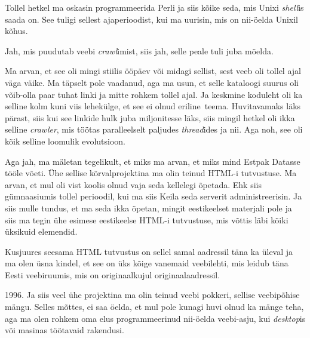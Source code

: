 
Tollel hetkel ma oskasin programmeerida Perli ja siis kõike 
seda, mis  Unixi \emph{shell}is saada on. See tuligi  sellest ajaperioodist, 
kui ma uurisin, mis on nii-öelda Unixil  kõhus.


Jah, mis puudutab veebi \emph{crawl}imist,  siis jah, selle peale tuli juba 
mõelda.


Ma arvan, et see oli mingi stiilis ööpäev või midagi sellist, sest veeb oli 
tollel ajal väga väike. Ma täpselt pole vaadanud, aga ma usun, et selle 
kataloogi suurus oli võib-olla paar tuhat linki ja mitte rohkem tollel ajal. Ja 
keskmine koduleht oli ka selline kolm kuni viis lehekülge, et see ei  olnud 
eriline teema. Huvitavamaks läks pärast, siis kui see linkide hulk juba 
miljonitesse läks, siis mingil hetkel oli ikka selline \emph{crawler}, mis 
töötas paralleelselt  paljudes \emph{thread}ides ja nii. Aga noh, see oli kõik 
selline loomulik evolutsioon. 

Aga jah, ma mäletan tegelikult, et miks ma arvan, et miks mind Estpak 
Datasse tööle võeti. Ühe sellise kõrvalprojektina ma olin 
teinud HTML-i tutvustuse. Ma arvan, et mul oli vist koolis olnud vaja seda 
kellelegi õpetada. Ehk siis gümnaasiumis tollel perioodil, kui ma siis Keila 
seda serverit administreerisin. Ja siis mulle tundus, et ma seda ikka õpetan, 
mingit eestikeelset materjali pole ja siis ma tegin ühe esimese  eestikeelse 
HTML-i tutvustuse, mis võttis läbi kõiki üksikuid elemendid. 


Kusjuures seesama HTML tutvustus on sellel samal aadressil täna ka üleval ja ma 
olen üsna kindel, et see on üks kõige vanemaid veebilehti, mis leidub täna 
Eesti veebiruumis, mis on originaalkujul originaalaadressil. 


1996. Ja siis veel ühe projektina ma olin teinud veebi pokkeri, sellise  
veebipõhise mängu. Selles mõttes,  ei saa öelda, et  mul pole kunagi huvi olnud 
ka mänge teha, aga ma olen  rohkem  oma elus programmeerinud nii-öelda 
veebi-asju, kui \emph{desktop}is või masinas töötavaid rakendusi. 

